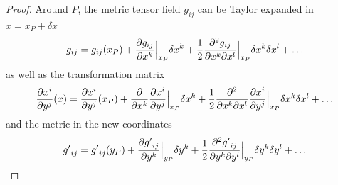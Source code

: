    \begin{proof}
        Around $P$, the metric tensor field $g_{ij}$ can be Taylor expanded in $x = x_P + \delta x$
        \begin{equation} \label{proof5}
            g_{ij} = g_{ij} (x_P) + \frac{\partial g_{ij}}{\partial x^k} \Big\vert_{x_P} \delta x^k + \frac{1}{2} \frac{\partial^2 g_{ij}}{\partial x^k \partial x^l} \Big\vert_{x_P} \delta x^k \delta x^l + \ldots
        \end{equation}
        as well as the transformation matrix 
        \begin{equation}\label{proof6}
            \frac{\partial x^i}{\partial y^j} (x) = \frac{\partial x^i}{\partial y^j} (x_P) + \frac{\partial}{\partial x^k} \frac{\partial x^i}{\partial y^j} \Big\vert_{x_P} \delta x^k + \frac{1}{2} \frac{\partial^2 }{\partial x^k \partial x^l} \frac{\partial x^i}{\partial y^j} \Big\vert_{x_P} \delta x^k \delta x^l + \ldots
        \end{equation}
        and the metric in the new coordinates
        \begin{equation} \label{proof7}
            {g'}_{ij} = {g'}_{ij} (y_P) + \frac{\partial{g'}_{ij}}{\partial y^k} \Big\vert_{y_P} \delta y^k + \frac{1}{2} \frac{\partial^2 {g'}_{ij}}{\partial y^k \partial y^l} \Big\vert_{y_P} \delta y^k \delta y^l + \ldots
        \end{equation}


\end{proof}
